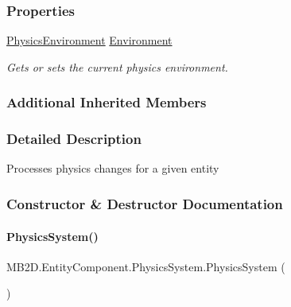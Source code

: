 \subsubsection*{Properties}
\begin{DoxyCompactItemize}
\item 
\hyperlink{class_m_b2_d_1_1_entity_component_1_1_physics_environment}{Physics\+Environment} \hyperlink{class_m_b2_d_1_1_entity_component_1_1_physics_system_aa3340a463c0cc2dd1c765c350352c213}{Environment}
\begin{DoxyCompactList}\small\item\em Gets or sets the current physics environment. \end{DoxyCompactList}\end{DoxyCompactItemize}
\subsubsection*{Additional Inherited Members}


\subsubsection{Detailed Description}
Processes physics changes for a given entity 



\subsubsection{Constructor \& Destructor Documentation}
\hypertarget{class_m_b2_d_1_1_entity_component_1_1_physics_system_a3ab72aac19449619200d2353572b28b0}{}\label{class_m_b2_d_1_1_entity_component_1_1_physics_system_a3ab72aac19449619200d2353572b28b0} 
\paragraph{\texorpdfstring{Physics\+System()}{PhysicsSystem()}}
{\footnotesize\ttfamily M\+B2\+D.\+Entity\+Component.\+Physics\+System.\+Physics\+System (\begin{DoxyParamCaption}{ }\end{DoxyParamCaption})\hspace{0.3cm}{\ttfamily [inline]}}



